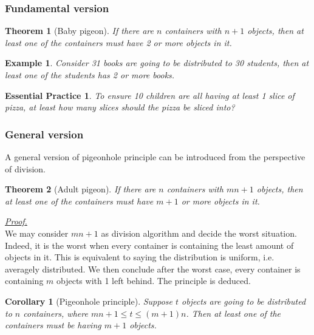 \documentclass[12pt]{article}
\newtheorem*{theorem}{Theorem}
\newtheorem*{corollary}{Corollary}
\newtheorem*{example}{Example}
\newtheorem{exercise}{Essential Practice}[subsection]
\renewenvironment{proof}[1][Proof]{\begin{snugshade*} \underline{\textit{{#1}.}}\\}{\hfill \qedsymbol \end{snugshade*}}
\begin{document}
    \subsubsection*{Fundamental version}

    \begin{theorem}[Baby pigeon]
        If there are $n$ containers with $n+1$ objects, then at least one of the containers must have 2 or more objects in it.
    \end{theorem}

    \begin{example}
        Consider 31 books are going to be distributed to 30 students, then at least one of the students has 2 or more books.
    \end{example}

    \begin{exercise}
        To ensure 10 children are all having at least 1 slice of pizza, at least how many slices should the pizza be sliced into?
    \end{exercise}

    \subsubsection*{General version}

    A general version of pigeonhole principle can be introduced from the perspective of division.

    \begin{theorem}[Adult pigeon]
        If there are $n$ containers with $mn+1$ objects, then at least one of the containers must have $m+1$ or more objects in it.
    \end{theorem}

    \begin{proof}
        We may consider $mn+1$ as division algorithm and decide the worst situation. Indeed, it is the worst when every container is containing the least amount of objects in it. This is equivalent to saying the distribution is uniform, i.e. averagely distributed. We then conclude after the worst case, every container is containing $m$ objects with 1 left behind. The principle is deduced.
    \end{proof}

    \begin{corollary}[Pigeonhole principle]
        Suppose $t$ objects are going to be distributed to $n$ containers, where $mn+1\leq t\leq (m+1)n$. Then at least one of the containers must be having $m+1$ objects.
    \end{corollary}
\end{document}
